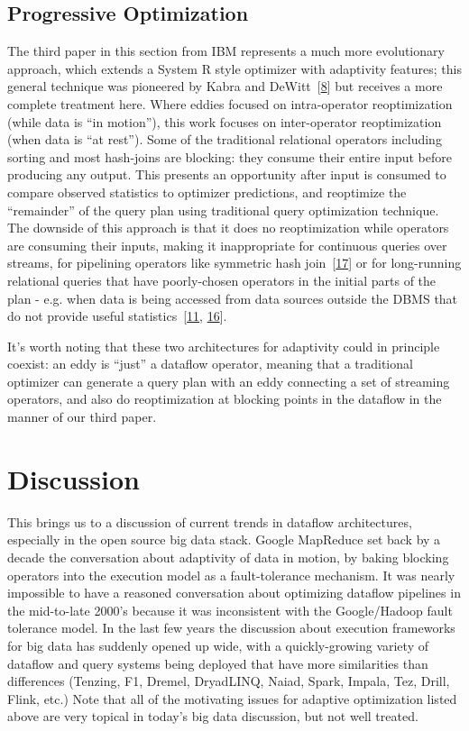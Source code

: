 \documentclass[b5paper,11pt,twoside,openright]{book}
\newcommand\Section[2]{
  \hypertarget{#1}{
    \section{#2}
  }
}
\begin{document}
\hypertarget{progressive-optimization}{%
  \subsection{Progressive Optimization}\label{progressive-optimization}}

The third paper in this section from IBM represents a much more
evolutionary approach, which extends a System R style optimizer with
adaptivity features; this general technique was pioneered by Kabra and
DeWitt~{{[}\protect\hyperlink{ref-kabra1998efficient}{8}{]}} but
receives a more complete treatment here. Where eddies focused on
intra-operator reoptimization (while data is ``in motion''), this work
focuses on inter-operator reoptimization (when data is ``at rest'').
Some of the traditional relational operators including sorting and most
hash-joins are blocking: they consume their entire input before
producing any output. This presents an opportunity after input is
consumed to compare observed statistics to optimizer predictions, and
reoptimize the ``remainder'' of the query plan using traditional query
optimization technique. The downside of this approach is that it does no
reoptimization while operators are consuming their inputs, making it
inappropriate for continuous queries over streams, for pipelining
operators like symmetric hash
join~{{[}\protect\hyperlink{ref-wilschut1991dataflow}{17}{]}} or for
long-running relational queries that have poorly-chosen operators in the
initial parts of the plan - e.g. when data is being accessed from data
sources outside the DBMS that do not provide useful
statistics~{{[}\protect\hyperlink{ref-melton2002sql}{11},
  \protect\hyperlink{ref-urhan1998cost}{16}{]}}.

It's worth noting that these two architectures for adaptivity could in
principle coexist: an eddy is ``just'' a dataflow operator, meaning that
a traditional optimizer can generate a query plan with an eddy
connecting a set of streaming operators, and also do reoptimization at
blocking points in the dataflow in the manner of our third paper.

\Section{discussion}{
Discussion
}

This brings us to a discussion of current trends in dataflow
architectures, especially in the open source big data stack. Google
MapReduce set back by a decade the conversation about adaptivity of data
in motion, by baking blocking operators into the execution model as a
fault-tolerance mechanism. It was nearly impossible to have a reasoned
conversation about optimizing dataflow pipelines in the mid-to-late
2000's because it was inconsistent with the Google/Hadoop fault
tolerance model. In the last few years the discussion about execution
frameworks for big data has suddenly opened up wide, with a
quickly-growing variety of dataflow and query systems being deployed
that have more similarities than differences (Tenzing, F1, Dremel,
DryadLINQ, Naiad, Spark, Impala, Tez, Drill, Flink, etc.) Note that all
of the motivating issues for adaptive optimization listed above are very
topical in today's big data discussion, but not well treated.
\end{document}
